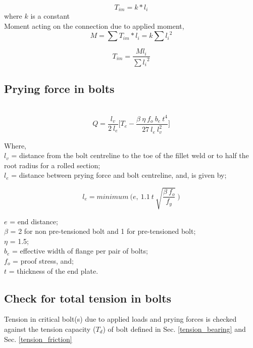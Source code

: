 \documentclass[11.5pt,a4paper,oneside]{report}
\begin{document}
\begin{Form}
\begin{equation}
	T_{im} = k * l_i 
\end{equation}
where $k$ is a constant\\
Moment acting on the connection due to applied moment, 
\begin{equation}
	M =  \sum T_{im} * l_i  = k \sum {l_i}^2
\end{equation}

\begin{equation}
	T_{im} = \frac {M l_i} {\sum {l_i}^2}
\end{equation}
\subsection{Prying force in bolts}
\quad \quad[Reference: Cl. 10.4.7, IS 800:2007] \\

\begin{equation}
	Q = \frac{l_v}{2~l_e} \bigg [T_e - \frac{\beta~ \eta~ f_o~b_e~t^{4}}{27~ l_e~l_v^{2}} \bigg]
\end{equation}

Where, \\
\indent $l_v$ = distance from the bolt centreline to the toe of the fillet weld or to half the root radius for a rolled section;\\
\indent $l_e$ = distance between prying force and bolt centreline, and, is given by;

\begin{equation}
	l_e = minimum~ \Bigg(e,~1.1~t~ \sqrt{\frac{\beta~f_o}{f_y}}~ \Bigg)
\end{equation}

\indent $e$ = end distance; \\
\indent $\beta$ = 2 for non pre-tensioned bolt and 1 for pre-tensioned bolt; \\
\indent $\eta$ = 1.5; \\
\indent $b_e$ = effective width of flange per pair of bolts; \\
\indent $f_o$ = proof stress, and; \\
\indent $t$ = thickness of the end plate. \\


\subsection{Check for total tension in bolts}


Tension in critical bolt(s) due to applied loads and prying forces is checked against the tension capacity ($T_d$) of bolt defined in Sec. \ref{tension_bearing} and Sec. \ref{tension_friction} \\


\end{Form}
\end{document}
